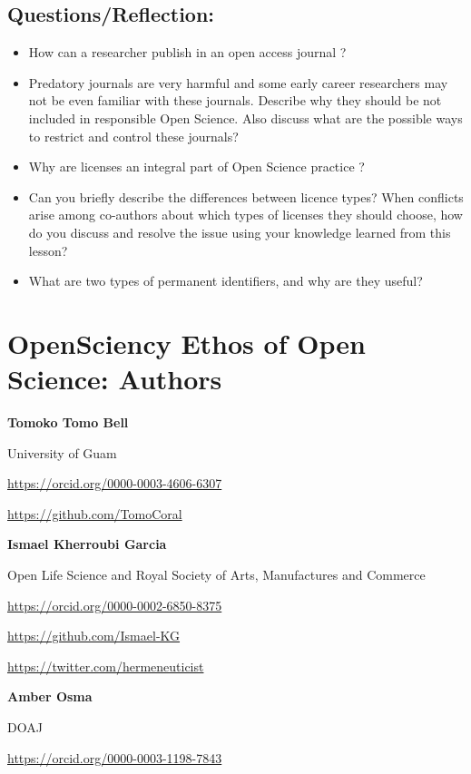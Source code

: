 \documentclass[
  letterpaper,
  DIV=11,
  numbers=noendperiod]{scrreport}
\providecommand{\tightlist}{%
  \setlength{\itemsep}{0pt}\setlength{\parskip}{0pt}}\usepackage{longtable,booktabs,array}
\begin{document}
\hypertarget{questionsreflection-4}{%
\section{Questions/Reflection:}\label{questionsreflection-4}}

\begin{itemize}
\tightlist
\item
  How can a researcher publish in an open access journal ?
\item
  Predatory journals are very harmful and some early career researchers
  may not be even familiar with these journals. Describe why they should
  be not included in responsible Open Science. Also discuss what are the
  possible ways to restrict and control these journals?
\item
  Why are licenses an integral part of Open Science practice ?
\item
  Can you briefly describe the differences between licence types? When
  conflicts arise among co-authors about which types of licenses they
  should choose, how do you discuss and resolve the issue using your
  knowledge learned from this lesson?
\item
  What are two types of permanent identifiers, and why are they useful?
\end{itemize}

\hypertarget{opensciency-ethos-of-open-science-authors}{%
\chapter{OpenSciency Ethos of Open Science:
Authors}\label{opensciency-ethos-of-open-science-authors}}

\textbf{Tomoko Tomo Bell}

University of Guam

\url{https://orcid.org/0000-0003-4606-6307}

\url{https://github.com/TomoCoral}

\textbf{Ismael Kherroubi Garcia}

Open Life Science and Royal Society of Arts, Manufactures and Commerce

\url{https://orcid.org/0000-0002-6850-8375}

\url{https://github.com/Ismael-KG}

\url{https://twitter.com/hermeneuticist}

\textbf{Amber Osma}

DOAJ

\url{https://orcid.org/0000-0003-1198-7843}
\end{document}
